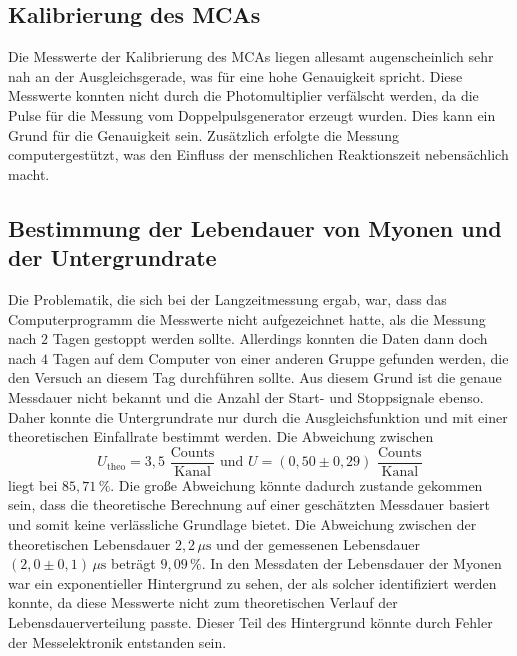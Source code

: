 \subsection{Kalibrierung des MCAs}
Die Messwerte der Kalibrierung des MCAs liegen allesamt augenscheinlich sehr nah an der Ausgleichsgerade, was für eine hohe 
Genauigkeit spricht. 
Diese Messwerte konnten nicht durch die Photomultiplier verfälscht werden, da die Pulse für die Messung vom Doppelpulsgenerator erzeugt wurden. 
Dies kann ein Grund für die Genauigkeit sein.
Zusätzlich erfolgte die Messung computergestützt, was den Einfluss der menschlichen Reaktionszeit nebensächlich macht. 

\subsection{Bestimmung der Lebendauer von Myonen und der Untergrundrate}
Die Problematik, die sich bei der Langzeitmessung ergab, war, dass das Computerprogramm die Messwerte nicht aufgezeichnet hatte, als
die Messung nach $2$ Tagen gestoppt werden sollte. Allerdings konnten die Daten dann doch nach $4$ Tagen auf dem Computer von einer 
anderen Gruppe gefunden werden, die den Versuch an diesem Tag durchführen sollte. Aus diesem Grund ist die genaue Messdauer nicht
bekannt und die Anzahl der Start- und Stoppsignale ebenso. Daher konnte die Untergrundrate nur durch die Ausgleichsfunktion und 
mit einer theoretischen Einfallrate bestimmt werden. Die Abweichung zwischen 
$$U_{\text{theo}} = 3,5 \,\, \frac{\text{Counts}}{\text{Kanal}}\,\, \text{und} \,\, U = (0,50 \pm 0,29) \,\, \frac{\text{Counts}}{\text{Kanal}}$$
liegt bei $85,71 \, \%$.
Die große Abweichung könnte dadurch zustande gekommen sein, dass die theoretische Berechnung auf einer geschätzten Messdauer basiert und somit keine verlässliche Grundlage bietet.
Die Abweichung zwischen der theoretischen Lebensdauer $2,2 \, \unit{\mu\second}$ und der gemessenen Lebensdauer 
$(2,0 \pm 0,1)\, \unit{\mu\second}$ beträgt $9,09 \, \%$. In den Messdaten der Lebensdauer der Myonen war ein exponentieller Hintergrund zu sehen, der als solcher identifiziert werden konnte, da diese Messwerte nicht zum theoretischen Verlauf der Lebensdauerverteilung passte. Dieser Teil des Hintergrund könnte durch Fehler der Messelektronik entstanden sein.


